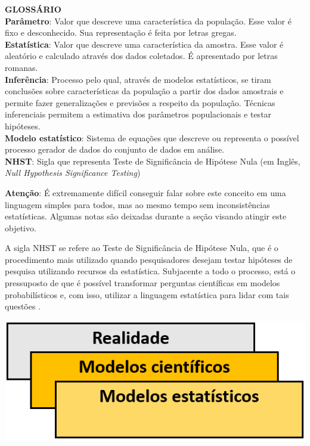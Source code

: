 \documentclass[
]{book}
\newenvironment{glossario}{
  \definecolor{shadecolor}{rgb}{0, 0, 0}  %
  \color{white}
  \begin{shaded}}
 {\end{shaded}}
\newenvironment{warning}{
  \definecolor{shadecolor}{rgb}{0, 0, 0}  %
  \color{white}
  \begin{shaded}}
 {\end{shaded}}
\begin{document}
\begin{glossario}

\textbf{GLOSSÁRIO}\\
\textbf{Parâmetro}: Valor que descreve uma característica da população. Esse valor é fixo e desconhecido. Sua representação é feita por letras gregas.\\
\textbf{Estatística}: Valor que descreve uma característica da amostra. Esse valor é aleatório e calculado através dos dados coletados. É apresentado por letras romanas.\\
\textbf{Inferência}: Processo pelo qual, através de modelos estatísticos, se tiram conclusões sobre características da população a partir dos dados amostrais e permite fazer generalizações e previsões a respeito da população. Técnicas inferenciais permitem a estimativa dos parâmetros populacionais e testar hipóteses.\\
\textbf{Modelo estatístico}: Sistema de equações que descreve ou representa o possível processo gerador de dados do conjunto de dados em análise.\\
\textbf{NHST}: Sigla que representa Teste de Significância de Hipótese Nula (em Inglês, \emph{Null Hypothesis Significance Testing})

\end{glossario}

\begin{warning}

\textbf{Atenção}: É extremamente difícil conseguir falar sobre este conceito em uma linguagem simples para todos, mas ao mesmo tempo sem inconsistências estatísticas. Algumas notas são deixadas durante a seção visando atingir este objetivo.

\end{warning}

A sigla NHST se refere ao Teste de Significância de Hipótese Nula, que é o procedimento mais utilizado quando pesquisadores desejam testar hipóteses de pesquisa utilizando recursos da estatística. Subjacente a todo o processo, está o pressuposto de que é possível transformar perguntas científicas em modelos probabilísticos e, com isso, utilizar a linguagem estatística para lidar com tais questões \citep{Curley013}.

\includegraphics{./img/cap_inferencia_modelos_estatisticos.png}
\end{document}
